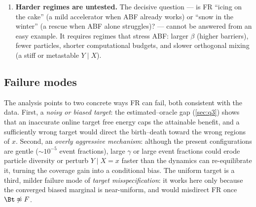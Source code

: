 \begin{enumerate}
        agree with the kernel reference to within tolerance, but they are not
        mathematically identical to the original kernel notebook implementation
        (\texttt{ABF-FR.ipynb}); a residual discretisation difference exists by
        construction.
  \item \textbf{Harder regimes are untested.} The decisive question --- is FR
        ``icing on the cake'' (a mild accelerator when ABF already works) or
        ``snow in the winter'' (a rescue when ABF alone struggles)? --- cannot
        be answered from an easy example. It requires regimes that stress ABF:
        larger $\beta$ (higher barriers), fewer particles, shorter computational
        budgets, and slower orthogonal mixing (a stiff or metastable $Y\mid X$).
\end{enumerate}

\subsection{Failure modes}
The analysis points to two concrete ways FR can fail, both consistent with the
data. First, a \emph{noisy or biased target}: the estimated--oracle gap
(\cref{sec:q3}) shows that an inaccurate online target free energy caps the
attainable benefit, and a sufficiently wrong target would direct the
birth--death toward the wrong regions of $x$. Second, an \emph{overly aggressive
mechanism}: although the present configurations are gentle ($\sim10^{-5}$ event
fractions), large $\gamma$ or large event fractions could erode particle
diversity or perturb $Y\mid X=x$ faster than the dynamics can re-equilibrate it,
turning the coverage gain into a conditional bias. The uniform target is a third,
milder failure mode of \emph{target misspecification}: it works here only because
the converged biased marginal is near-uniform, and would misdirect FR once
$\Bt\not\approx F$.

